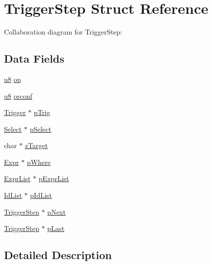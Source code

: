 \hypertarget{struct_trigger_step}{}\section{Trigger\+Step Struct Reference}
\label{struct_trigger_step}


Collaboration diagram for Trigger\+Step\+:
\subsection*{Data Fields}
\begin{DoxyCompactItemize}
\item 
\hyperlink{sqlite3_8c_a74a0f6424ae628af25f23f0a35f6ead3}{u8} \hyperlink{struct_trigger_step_a0991b29aa40e12f033237266ebe6610c}{op}
\item 
\hyperlink{sqlite3_8c_a74a0f6424ae628af25f23f0a35f6ead3}{u8} \hyperlink{struct_trigger_step_acd8a3ffdaa6342753efa34131e0f414f}{orconf}
\item 
\hyperlink{struct_trigger}{Trigger} $\ast$ \hyperlink{struct_trigger_step_aa795f89271dd5477d90d958829450199}{p\+Trig}
\item 
\hyperlink{struct_select}{Select} $\ast$ \hyperlink{struct_trigger_step_ab0e0ccc47de126415a7ad889ff1d228a}{p\+Select}
\item 
char $\ast$ \hyperlink{struct_trigger_step_a43612a4dd380649736cd8212f60f4e57}{z\+Target}
\item 
\hyperlink{struct_expr}{Expr} $\ast$ \hyperlink{struct_trigger_step_aa35a11dc7821bfaf357249ff3da68863}{p\+Where}
\item 
\hyperlink{struct_expr_list}{Expr\+List} $\ast$ \hyperlink{struct_trigger_step_a59f61440b4fb0aa52cc63f045cc0abfa}{p\+Expr\+List}
\item 
\hyperlink{struct_id_list}{Id\+List} $\ast$ \hyperlink{struct_trigger_step_a2a5b925a55a70856d6818870b53bd74a}{p\+Id\+List}
\item 
\hyperlink{struct_trigger_step}{Trigger\+Step} $\ast$ \hyperlink{struct_trigger_step_a0ad177537f1a6794a0ef4bc0f8a8609a}{p\+Next}
\item 
\hyperlink{struct_trigger_step}{Trigger\+Step} $\ast$ \hyperlink{struct_trigger_step_ac3ac638348976d194b8e3efe5111a5c1}{p\+Last}
\end{DoxyCompactItemize}


\subsection{Detailed Description}


